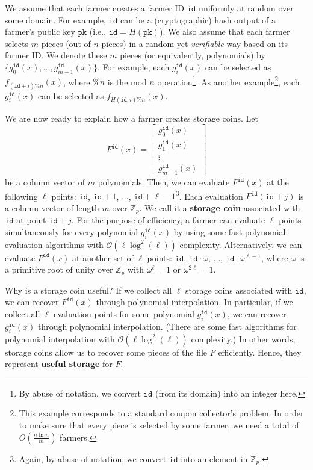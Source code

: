 \documentclass[12pt, onecolumn]{IEEEtran}
\newcommand{\Fp}{\mathbb{Z}_p}
\newcommand{\pk}{\texttt{pk}}
\newcommand{\id}{\texttt{id}}
\begin{document}
We assume that each farmer creates a farmer ID $\id$ uniformly at random over some domain. For example, $\id$ can be a (cryptographic) hash output of a farmer's public key $\pk$ (i.e., $\id = H(\pk)$).
We also assume that each farmer selects $m$ pieces (out of $n$ pieces) in a random yet \emph{verifiable} way based on its farmer ID.
We denote these $m$ pieces (or equivalently, polynomials) by $\{g_0^{\id}(x), \ldots, g_{m-1}^{\id}(x) \}$.
For example, each $g_i^{\id}(x)$ can be selected as $f_{(\id + i)\% n}(x)$, where $\% n$ is the mod $n$ operation\footnote{By abuse of notation, we convert $\id$ (from its domain) into an integer here.}.
As another example\footnote{This example corresponds to a standard coupon collector's problem. In order to make sure that every piece is selected by some farmer, we need a total of $O\left( \frac{n \ln n}{m} \right)$ farmers.}, each $g_i^{\id}(x)$ can be selected as $f_{H(\id, i)\% n}(x)$.

We are now ready to explain how a farmer creates storage coins. Let
\[
F^{\id}(x) = \begin{bmatrix} g_0^{\id}(x)\\ g_1^{\id}(x)\\  \vdots \\ g_{m-1}^{\id}(x) \end{bmatrix}
\]
be a column vector of $m$ polynomials. 
Then, we can evaluate $F^{\id}(x)$ at the following $\ell$ points: $\id$, $\id + 1$, $\ldots$, $\id + \ell - 1$\footnote{Again, by abuse of notation, we convert $\id$ into an element in $\Fp$.}.
Each evaluation $F^{\id}(\id + j)$ is a column vector of length $m$ over $\Fp$. We  call it a {\bf storage coin}
associated with $\id$ at point $\id + j$.
For the purpose of efficiency, a farmer can evaluate $\ell$ points simultaneously for every polynomial $g_i^{\id}(x)$
by using some fast polynomial-evaluation algorithms with $\mathcal{O}(\ell \log^2(\ell))$ complexity.
Alternatively, we can evaluate $F^{\id}(x)$ at another set of $\ell$ points: $\id$, $\id \cdot \omega$, $\ldots$, $\id \cdot \omega^{\ell - 1}$, where $\omega$ is a primitive root of unity over $\Fp$ with $\omega^\ell = 1$ or $\omega^{2 \ell} = 1$.


Why is a storage coin useful? If we collect all $\ell$ storage coins associated with $\id$, we can recover $F^{\id}(x)$ through polynomial interpolation.
In particular, if we collect all $\ell$ evaluation points for some polynomial $g_i^{\id}(x)$, we can recover $g_i^{\id}(x)$ through polynomial interpolation.
(There are some fast algorithms for polynomial interpolation with $\mathcal{O}(\ell \log^2(\ell))$ complexity.)
In other words, storage coins allow us to recover some pieces of the file $F$ efficiently. Hence, they represent {\bf useful storage} for $F$.
\end{document}
